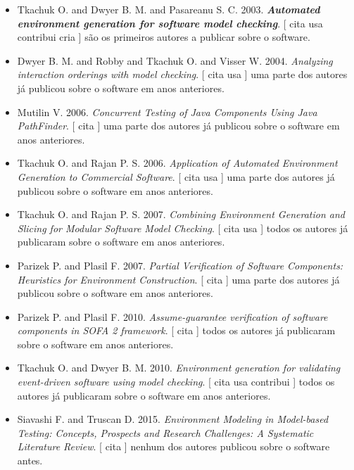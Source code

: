 \begin{itemize}
\item Tkachuk O. and Dwyer B. M. and Pasareanu S. C.
      2003.
        \textbf{\textit{ Automated environment generation for software model checking}}.
      [
          cita
          usa
          contribui
          cria
      ]
são os primeiros autores a publicar sobre o software.
\item Dwyer B. M. and Robby and Tkachuk O. and Visser W.
      2004.
        \textit{ Analyzing interaction orderings with model checking}.
      [
          cita
          usa
      ]
uma parte dos autores já publicou sobre o software em anos anteriores.
\item Mutilin V.
      2006.
        \textit{ Concurrent Testing of Java Components Using Java PathFinder}.
      [
          cita
      ]
uma parte dos autores já publicou sobre o software em anos anteriores.
\item Tkachuk O. and Rajan P. S.
      2006.
        \textit{ Application of Automated Environment Generation to Commercial Software}.
      [
          cita
          usa
      ]
uma parte dos autores já publicou sobre o software em anos anteriores.
\item Tkachuk O. and Rajan P. S.
      2007.
        \textit{ Combining Environment Generation and Slicing for Modular Software Model Checking}.
      [
          cita
          usa
      ]
todos os autores já publicaram sobre o software em anos anteriores.
\item Parizek P. and Plasil F.
      2007.
        \textit{ Partial Verification of Software Components: Heuristics for Environment Construction}.
      [
          cita
      ]
uma parte dos autores já publicou sobre o software em anos anteriores.
\item Parizek P. and Plasil F.
      2010.
        \textit{ Assume-guarantee verification of software components in SOFA 2 framework}.
      [
          cita
      ]
todos os autores já publicaram sobre o software em anos anteriores.
\item Tkachuk O. and Dwyer B. M.
      2010.
        \textit{ Environment generation for validating event-driven software using model checking}.
      [
          cita
          usa
          contribui
      ]
todos os autores já publicaram sobre o software em anos anteriores.
\item Siavashi F. and Truscan D.
      2015.
        \textit{ Environment Modeling in Model-based Testing: Concepts, Prospects and Research Challenges: A Systematic Literature Review}.
      [
          cita
      ]
nenhum dos autores publicou sobre o software antes.
\end{itemize}
